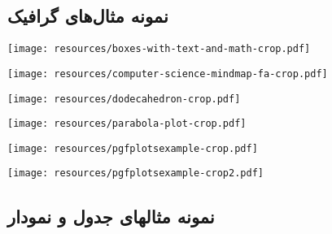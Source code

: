 \subsection{نمونه مثال‌های گرافیک}
\begin{plainslide}
\begin{center}
\texttt{[image: resources/boxes-with-text-and-math-crop.pdf]}
\end{center}
\end{plainslide}
\begin{plainslide}
\begin{center}
\texttt{[image: resources/computer-science-mindmap-fa-crop.pdf]}
\end{center}
\end{plainslide}
\begin{plainslide}
\begin{center}
\texttt{[image: resources/dodecahedron-crop.pdf]}
\end{center}
\end{plainslide}
\begin{plainslide}
\begin{center}
\texttt{[image: resources/parabola-plot-crop.pdf]}
\end{center}
\end{plainslide}
\begin{plainslide}
\begin{center}
\texttt{[image: resources/pgfplotsexample-crop.pdf]}
\end{center}
\end{plainslide}
\begin{plainslide}
\begin{center}
\texttt{[image: resources/pgfplotsexample-crop2.pdf]}
\end{center}
\end{plainslide}

\subsection[مثال جدول و نمودار]{نمونه مثالهای جدول و نمودار} 
\begin{plainslide}%
\end{plainslide}


